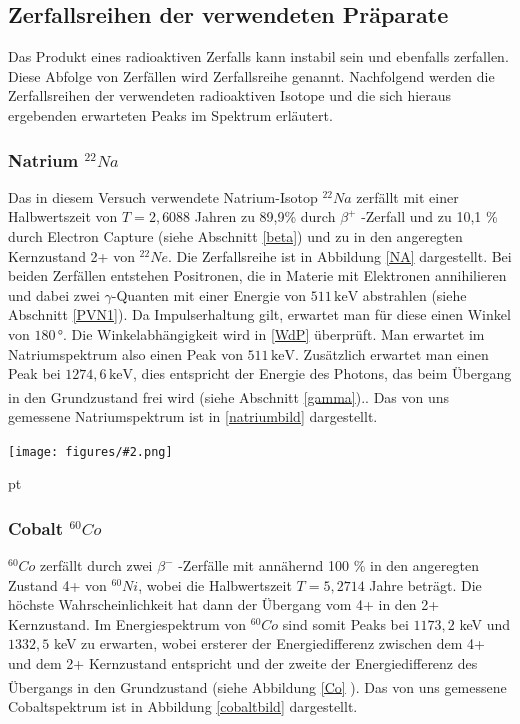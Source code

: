 \documentclass[12pt,listof=totoc]{scrartcl}
\newcommand{\gra}[3][0.7]{
	\begin{minipage}[h!]{\textwidth}
		\centering
		\texttt{[image: figures/\#2.png]}
		\captionof{figure}{#3}
	\end{minipage}
	\vskip 30 pt
}
\begin{document}
 
 \subsection{Zerfallsreihen der verwendeten Präparate \label{ZR}}
 
 Das Produkt eines radioaktiven Zerfalls kann instabil sein und ebenfalls zerfallen. Diese
 Abfolge von Zerfällen wird Zerfallsreihe genannt. Nachfolgend werden die Zerfallsreihen der verwendeten radioaktiven Isotope und die sich hieraus ergebenden erwarteten Peaks im Spektrum erläutert.
 
 \subsubsection{Natrium $^{22}Na$}
 Das in diesem Versuch verwendete Natrium-Isotop $^{22}Na$ zerfällt mit einer Halbwertszeit von $T=2,6088$ Jahren zu  89,9\% durch $\beta^+$ -Zerfall und zu  10,1 \% durch Electron Capture (siehe Abschnitt \ref{beta}) und zu  in den angeregten Kernzustand 2+ von $^{22}Ne$. Die Zerfallsreihe ist in Abbildung \ref{NA} dargestellt. Bei beiden Zerfällen entstehen Positronen, die in Materie mit Elektronen annihilieren und dabei zwei $\gamma$-Quanten mit einer Energie von $511\,\mathrm{keV}$ abstrahlen (siehe Abschnitt \ref{PVN1}). Da Impulserhaltung gilt, erwartet man für diese einen Winkel von $180\,\mathrm{°}$. Die Winkelabhängigkeit wird in \ref{WdP} überprüft. Man erwartet im Natriumspektrum also einen Peak von $511\,\mathrm{keV}$. Zusätzlich erwartet man einen Peak bei $1274,6\,\mathrm{keV}$, dies entspricht der Energie des Photons, das beim Übergang in den Grundzustand frei wird (siehe Abschnitt \ref{gamma}).\textsuperscript{\cite{staat}}. Das von uns gemessene Natriumspektrum ist in \ref{natriumbild} dargestellt.
 
 \gra{Zerfallsreihe-Na}{Zerfallsreihe von $^{22}Na$ \label{NA} \cite{staat}}
 
 \subsubsection{Cobalt  $^{60}Co$}
 $^{60}Co$ zerfällt durch zwei $\beta^-$ -Zerfälle mit annähernd 100 \% in den angeregten Zustand 4+ von  $^{60}Ni$, wobei die Halbwertszeit $T=5,2714$ Jahre beträgt. Die höchste Wahrscheinlichkeit hat dann der Übergang vom 4+ in den 2+ Kernzustand. Im Energiespektrum von $^{60}Co$ sind somit Peaks bei $1173,2$ keV und $1332,5$ keV  zu erwarten, wobei ersterer der Energiedifferenz zwischen dem 4+ und dem 2+ Kernzustand entspricht und der zweite der Energiedifferenz des Übergangs in den Grundzustand\textsuperscript{\cite{staat}} (siehe Abbildung \ref{Co} ). Das von uns gemessene Cobaltspektrum ist in Abbildung \ref{cobaltbild} dargestellt.
 
\end{document}
